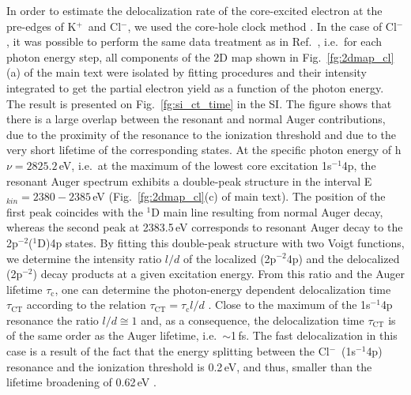 \documentclass[journal=jpclcd,manuscript=letter]{achemso}
\begin{document}
In order to estimate the delocalization rate of the core-excited electron at the pre-edges of K$^{+}$~and Cl$^{-}$, we used the core-hole clock method \cite{bjorneholm92:1892,karis96:1380,wurth00:141,bruehwiler02:703,foehlisch05:373}. In the case of Cl$^{-}$, it was possible to perform the same data treatment as in Ref.\ \cite{ceolin15:022502}, i.e.\ for each photon energy step, all components of the 2D map shown in Fig.\ \ref{fg:2dmap_cl}(a) of the main text were isolated by fitting procedures and their intensity integrated to get the partial electron yield as a function of the photon energy. The result is presented on Fig.\ \ref{fg:si_ct_time} in the SI. The figure shows that there is a large overlap between the resonant and normal Auger contributions, due to the proximity of the resonance to the ionization threshold and due to the very short lifetime of the corresponding states. At the specific photon energy of h$\nu = 2825.2$\,eV, i.e.\ at the maximum of the lowest core excitation 1s$^{-1}$4p, the resonant Auger spectrum exhibits a double-peak structure in the interval E$_{kin} = 2380 - 2385$\,eV (Fig.\ \ref{fg:2dmap_cl}(c) of main text). The position of the first peak coincides with the $^1$D main line resulting from normal Auger decay, whereas the second peak at 2383.5\,eV corresponds to resonant Auger decay to the 2p$^{-2}$($^1$D)4p states. By fitting this double-peak structure with two Voigt functions, we determine the intensity ratio $l/d$ of the localized (2p$^{-2}$4p) and the delocalized (2p$^{-2}$) decay products at a given excitation energy. From this ratio and the Auger lifetime $\tau_{\text{c}}$, one can determine the photon-energy dependent delocalization time $\tau_{\text{CT}}$ according to the relation $\tau_{\text{CT}} = \tau_{\text{c}}l/d$ \citep{bjorneholm92:1892,karis96:1380,wurth00:141,bruehwiler02:703,foehlisch05:373}. Close to the maximum of the 1s$^{-1}$4p resonance the ratio $l/d \cong 1$ and, as a consequence, the delocalization time $\tau_{\text{CT}}$ is of the same order as the Auger lifetime, i.e.\ $\sim$1\,fs. The fast delocalization in this case is a result of the fact that the energy splitting between the Cl$^{-}$~(1s$^{-1}$4p) resonance and the ionization threshold is 0.2\,eV, and thus, smaller than the lifetime broadening of 0.62\,eV \citep{ceolin17:263003}.
\end{document}
